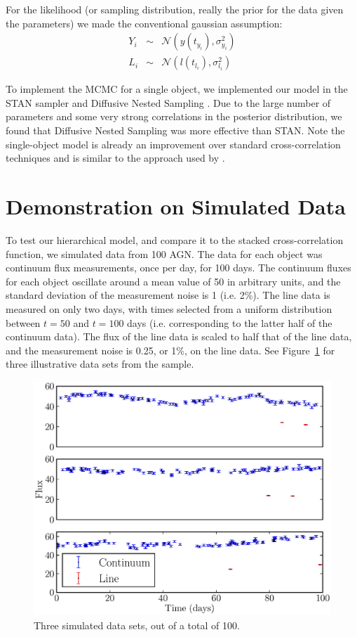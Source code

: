 \documentclass[useAMS,usenatbib]{mn2e}
\begin{document}
For the likelihood (or sampling distribution, really the prior for the data
given the parameters) we made the conventional gaussian assumption:
\begin{eqnarray}
Y_i &\sim& \mathcal{N}\left(y(t_{y_i}), \sigma_{y_i}^2\right)\\
L_i &\sim& \mathcal{N}\left(l(t_{l_i}), \sigma_{l_i}^2\right)
\end{eqnarray}

To implement the MCMC for a single object,
we implemented our model in the STAN sampler \citep{nuts}
and Diffusive Nested Sampling \citep{dnest}. Due to the large number of
parameters and some very strong correlations in the posterior distribution,
we found that Diffusive Nested Sampling was more effective than STAN.
Note the single-object model is already an improvement over standard
cross-correlation techniques and is similar to the approach used by
\citep{2011ApJ...735...80Z}.

\section{Demonstration on Simulated Data}
To test our hierarchical model, and compare it to the stacked cross-correlation
function, we simulated data from 100 AGN. The data for each object was
continuum flux measurements, once per day, for 100 days. The continuum fluxes
for each object oscillate around a mean value of 50 in arbitrary units, and the
standard deviation of the measurement noise is 1 (i.e. 2\%). The line data is measured on
only two days, with times selected from a uniform distribution between $t=50$
and $t=100$ days (i.e. corresponding to the latter half of the continuum data).
The flux of the line data is scaled to half that of the line data, and the
measurement noise is 0.25, or 1\%, on the line data. See Figure~\ref{fig:data}
for three illustrative data sets from the sample.

\begin{figure}
\begin{center}
\includegraphics[scale=0.5]{Figures/data.eps}
\caption{Three simulated data sets, out of a total of 100.\label{fig:data}}
\end{center}
\end{figure}
\end{document}

